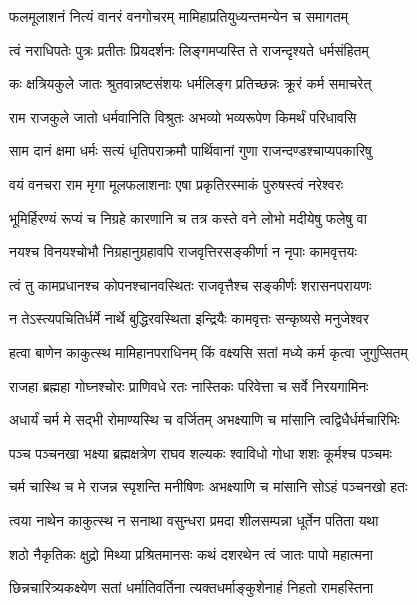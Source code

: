 \twolineshloka
{फलमूलाशनं नित्यं वानरं वनगोचरम्}
{मामिहाप्रतियुध्यन्तमन्येन च समागतम्} %

\twolineshloka
{त्वं नराधिपतेः पुत्रः प्रतीतः प्रियदर्शनः}
{लिङ्गमप्यस्ति ते राजन्दृश्यते धर्मसंहितम्} %

\twolineshloka
{कः क्षत्रियकुले जातः श्रुतवान्नष्टसंशयः}
{धर्मलिङ्ग प्रतिच्छन्नः क्रूरं कर्म समाचरेत्} %

\twolineshloka
{राम राजकुले जातो धर्मवानिति विश्रुतः}
{अभव्यो भव्यरूपेण किमर्थं परिधावसि} %

\twolineshloka
{साम दानं क्षमा धर्मः सत्यं धृतिपराक्रमौ}
{पार्थिवानां गुणा राजन्दण्डश्चाप्यपकारिषु} %

\twolineshloka
{वयं वनचरा राम मृगा मूलफलाशनाः}
{एषा प्रकृतिरस्माकं पुरुषस्त्वं नरेश्वरः} %

\twolineshloka
{भूमिर्हिरण्यं रूप्यं च निग्रहे कारणानि च}
{तत्र कस्ते वने लोभो मदीयेषु फलेषु वा} %

\twolineshloka
{नयश्च विनयश्चोभौ निग्रहानुग्रहावपि}
{राजवृत्तिरसङ्कीर्णा न नृपाः कामवृत्तयः} %

\twolineshloka
{त्वं तु कामप्रधानश्च कोपनश्चानवस्थितः}
{राजवृत्तैश्च सङ्कीर्णः शरासनपरायणः} %

\twolineshloka
{न तेऽस्त्यपचितिर्धर्मे नार्थे बुद्धिरवस्थिता}
{इन्द्रियैः कामवृत्तः सन्कृष्यसे मनुजेश्वर} %

\twolineshloka
{हत्वा बाणेन काकुत्स्थ मामिहानपराधिनम्}
{किं वक्ष्यसि सतां मध्ये कर्म कृत्वा जुगुप्सितम्} %

\twolineshloka
{राजहा ब्रह्महा गोघ्नश्चोरः प्राणिवधे रतः}
{नास्तिकः परिवेत्ता च सर्वे निरयगामिनः} %

\twolineshloka
{अधार्यं चर्म मे सद्भी रोमाण्यस्थि च वर्जितम्}
{अभक्ष्याणि च मांसानि त्वद्विधैर्धर्मचारिभिः} %

\twolineshloka
{पञ्च पञ्चनखा भक्ष्या ब्रह्मक्षत्रेण राघव}
{शल्यकः श्वाविधो गोधा शशः कूर्मश्च पञ्चमः} %

\twolineshloka
{चर्म चास्थि च मे राजन्न स्पृशन्ति मनीषिणः}
{अभक्ष्याणि च मांसानि सोऽहं पञ्चनखो हतः} %

\twolineshloka
{त्वया नाथेन काकुत्स्थ न सनाथा वसुन्धरा}
{प्रमदा शीलसम्पन्ना धूर्तेन पतिता यथा} %

\twolineshloka
{शठो नैकृतिकः क्षुद्रो मिथ्या प्रश्रितमानसः}
{कथं दशरथेन त्वं जातः पापो महात्मना} %

\twolineshloka
{छिन्नचारित्र्यकक्ष्येण सतां धर्मातिवर्तिना}
{त्यक्तधर्माङ्कुशेनाहं निहतो रामहस्तिना} %

